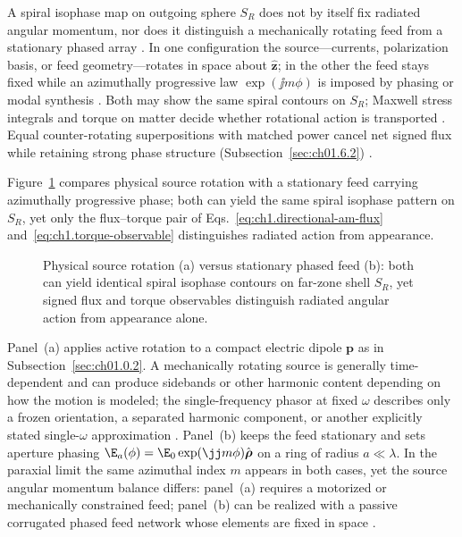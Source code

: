 A spiral isophase map on outgoing sphere $S_R$ does not by itself fix radiated angular momentum, nor does it distinguish a mechanically rotating feed from a stationary phased array \cite{beth1936}. In one configuration the source---currents, polarization basis, or feed geometry---rotates in space about \(\hat{\mathbf{z}}\); in the other the feed stays fixed while an azimuthally progressive law \(\exp(\jj m\phi)\) is imposed by phasing or modal synthesis \cite{harrington2001}. Both may show the same spiral contours on $S_R$; Maxwell stress integrals and torque on matter decide whether rotational action is transported \cite{beth1936,stratton1941}. Equal counter-rotating superpositions with matched power cancel net signed flux while retaining strong phase structure (Subsection~\ref{sec:ch01.6.2}) \cite{allen1992}.

Figure~\ref{fig:ch1.signature-rotation-duality} compares physical source rotation with a stationary feed carrying azimuthally progressive phase; both can yield the same spiral isophase pattern on \(S_R\), yet only the flux--torque pair of Eqs.~\eqref{eq:ch1.directional-am-flux} and~\eqref{eq:ch1.torque-observable} distinguishes radiated action from appearance.

\begin{figure}[t]
\centering
\VolIPhysFig{\VolIPhysRotationDuality}
\caption{Physical source rotation (a) versus stationary phased feed (b): both can yield identical spiral isophase contours on far-zone shell $S_R$, yet signed flux and torque observables distinguish radiated angular action from appearance alone.}
\label{fig:ch1.signature-rotation-duality}
\end{figure}

Panel~(a) applies active rotation to a compact electric dipole \(\mathbf{p}\) as in Subsection~\ref{sec:ch01.0.2}. A mechanically rotating source is generally time-dependent and can produce sidebands or other harmonic content depending on how the motion is modeled; the single-frequency phasor at fixed \(\omega\) describes only a frozen orientation, a separated harmonic component, or another explicitly stated single-$\omega$ approximation \cite{stratton1941}.
Panel~(b) keeps the feed stationary and sets aperture phasing
\(\E_a(\phi)=\E_0\exp(\jj m\phi)\hat{\boldsymbol{\rho}}\) on a ring of radius
\(a\ll\lambda\). In the paraxial limit the same azimuthal index \(m\) appears in
both cases, yet the source angular momentum balance differs: panel~(a) requires a
motorized or mechanically constrained feed; panel~(b) can be realized with a passive
corrugated phased feed network whose elements are fixed in space \cite{harrington2001}.


